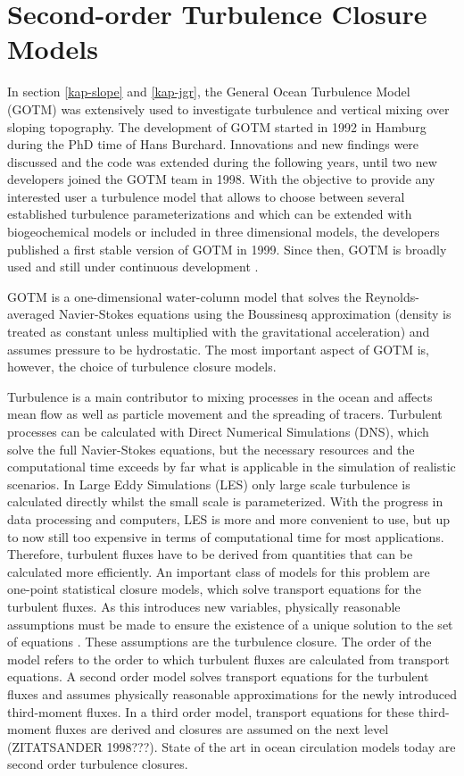 \chapter{Second-order Turbulence Closure Models}

In section \ref{kap-slope} and \ref{kap-jgr}, the General Ocean Turbulence Model (GOTM) was extensively used to investigate turbulence and vertical mixing over sloping topography. The development of GOTM started in 1992 in Hamburg during the PhD time of Hans Burchard. Innovations and new findings were discussed and the code was extended during the following years, until two new developers joined the GOTM team in 1998. With the objective to provide any interested user a turbulence model that allows to choose between several established turbulence parameterizations and which can be extended with biogeochemical models or included in three dimensional models, the developers published a first stable version of GOTM in 1999. Since then, GOTM is broadly used and still under continuous development \citep[][]{gotm1999}.

GOTM is a one-dimensional water-column model that solves the Reynolds-averaged Navier-Stokes equations using the Boussinesq approximation (density is treated as constant unless multiplied with the gravitational acceleration) and assumes pressure to be hydrostatic. The most important aspect of GOTM is, however, the choice of turbulence closure models. 

Turbulence is a main contributor to mixing processes in the ocean and affects mean flow as well as particle movement and the spreading of tracers. Turbulent processes can be calculated with Direct Numerical Simulations (DNS), which solve the full Navier-Stokes equations, but the necessary resources and the computational time exceeds by far what is applicable in the simulation of realistic scenarios. In Large Eddy Simulations (LES) only large scale turbulence is calculated directly whilst the small scale is parameterized. With the progress in data processing and computers, LES is more and more convenient to use, but up to now still too expensive in terms of computational time for most applications. Therefore, turbulent fluxes have to be derived from quantities that can be calculated more efficiently. An important class of models for this problem are one-point statistical closure models, which solve transport equations for the turbulent fluxes. As this introduces new variables, physically reasonable assumptions must be made to ensure the existence of a unique solution to the set of equations \citep[][]{UmlaufBurchard2005a}. These assumptions are the turbulence closure. The order of the model refers to the order to which turbulent fluxes are calculated from transport equations. A second order model solves transport equations for the turbulent fluxes and assumes physically reasonable approximations for the newly introduced third-moment fluxes. In a third order model, transport equations for these third-moment fluxes are derived and closures are assumed on the next level (ZITATSANDER 1998???). State of the art in ocean circulation models today are second order turbulence closures.

